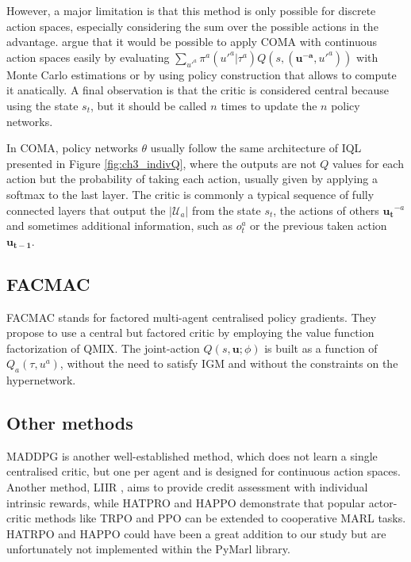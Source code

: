 However, a major limitation is that this method is only possible for discrete action spaces, especially considering the sum over the possible actions in the advantage.
\cite{foerster2017coma} argue that it would be possible to apply COMA with continuous action spaces easily by evaluating $\sum_{u'^{a}} \pi^a(u'^{a}|\tau^a) Q(s,(\mathbf{u^{-a}},u'^{a}))$ with Monte Carlo estimations or by using policy construction that allows to compute it anatically.
A final observation is that the critic is considered central because using the state $s_t$, but it should be called $n$ times to update the $n$ policy networks.

In COMA, policy networks $\theta$ usually follow the same architecture of IQL presented in Figure \ref{fig:ch3_indivQ}, where the outputs are not $Q$ values for each action but the probability of taking each action, usually given by applying a softmax to the last layer.
The critic is commonly a typical sequence of fully connected layers that output the $|\mathcal{U}_a|$ from the state $s_t$, the actions of others $\boldsymbol{u_t}^{-a}$ and sometimes additional information, such as $o_t^a$ or the previous taken action $\boldsymbol{u_{t-1}}$.

\subsection{FACMAC}

FACMAC \citep{peng2021facmac} stands for factored multi-agent centralised policy gradients.
They propose to use a central but factored critic by employing the value function factorization of QMIX.
The joint-action $Q(s, \boldsymbol{u};\phi)$ is built as a function of $Q_a(\tau, u^a)$, without the need to satisfy IGM and without the constraints on the hypernetwork.


\subsection{Other methods}
MADDPG \citep{lowe2017multi} is another well-established method, which does not learn a single centralised critic, but one per agent and is designed for continuous action spaces.
Another method, LIIR \citep{Du2019LIIRLearning}, aims to provide credit assessment with individual intrinsic rewards, while HATPRO and HAPPO \citep{kuba2021trust} demonstrate that popular actor-critic methods like TRPO \citep{schulman2015trust} and PPO \citep{schulman2017ppo} can be extended to cooperative MARL tasks.
HATRPO and HAPPO could have been a great addition to our study but are unfortunately not implemented within the PyMarl library.

